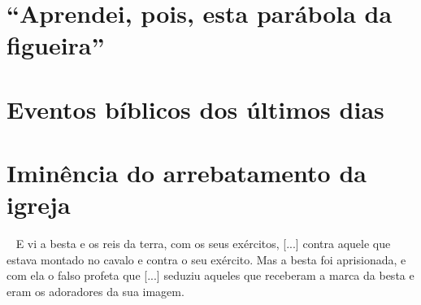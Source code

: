 \documentclass[12pt,aspectratio=169]{beamer}
\newcommand{\ver}[1]{%
    \raisebox{0.50ex}{%
        \scalebox{1.1}{%
            \pmb{\textbf{\textcolor{BSpbg}{#1}}}%
        }%
    }%
}
\newcommand{\QUOTE}[1]{%
    \par\noindent\hspace*{0.1\linewidth}%
    \begin{minipage}{0.8\linewidth}%
        \linespread{1.35}\large{#1}%
    \end{minipage}%
}
\newcommand{\ORA}[1]{{\textcolor{TXora}{#1}}}
\newcommand{\YEL}[1]{{\textcolor{TXyel}{#1}}}
\newcommand{\GRE}[1]{{\textcolor{TXgre}{#1}}}
\newcommand{\MAG}[1]{{\textcolor{TXmag}{#1}}}
\newcommand{\BRI}[1]{{\textcolor{BSpbg}{#1}}}   %
\begin{document}
\section{``Aprendei, pois, esta parábola da figueira''}

\section{Eventos bíblicos dos últimos dias}

\section{Iminência do arrebatamento da igreja}

    \begin{frame}
        \QUOTE{%
            \ver{(ARA) Ap~19.19,20}~%
            E vi a \YEL{besta} e os reis da terra,  com  os  seus  exércitos,  [...]  contra
            \BRI{aquele que estava montado no  cavalo}  e  contra  o  seu  exército.  Mas  a
            \YEL{besta} foi aprisionada, e com ela o \ORA{falso profeta} que  [...]  seduziu
            aqueles que receberam a \MAG{marca da besta} e eram os  adoradores  da  \GRE{sua
            imagem}. \\[\bigskipamount]
        }
    \end{frame}



\end{document}
